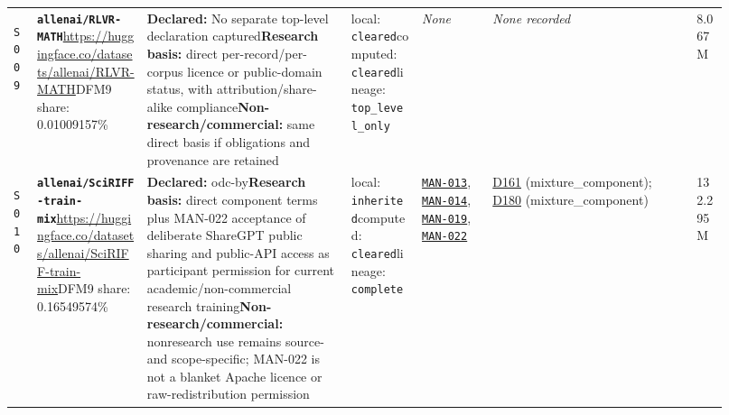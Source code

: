 \documentclass[9pt,a4paper]{article}
\newcommand{\srcid}[1]{\hypertarget{src:#1}{\texttt{#1}}}
\begin{document}
\begin{landscape}
\begin{longtable}{@{}L{0.03\linewidth}L{0.14\linewidth}L{0.26\linewidth}L{0.09\linewidth}L{0.09\linewidth}L{0.265\linewidth}L{0.045\linewidth}@{}}
\srcid{S009} & \textbf{\nolinkurl{allenai/RLVR-MATH}}\newline \url{https://huggingface.co/datasets/allenai/RLVR-MATH}\newline DFM9 share: 0.01009157\% & \textbf{Declared:} No separate top-level declaration captured\newline \textbf{Research basis:} direct per-record/per-corpus licence or public-domain status, with attribution/share-alike compliance\newline \textbf{Non-research/commercial:} same direct basis if obligations and provenance are retained & local: \texttt{cleared}\newline computed: \texttt{cleared}\newline lineage: \texttt{top\_level\_only} & \textit{None} & \textit{None recorded} & 8.067M \\
\srcid{S010} & \textbf{\nolinkurl{allenai/SciRIFF-train-mix}}\newline \url{https://huggingface.co/datasets/allenai/SciRIFF-train-mix}\newline DFM9 share: 0.16549574\% & \textbf{Declared:} odc-by\newline \textbf{Research basis:} direct component terms plus MAN-022 acceptance of deliberate ShareGPT public sharing and public-API access as participant permission for current academic/non-commercial research training\newline \textbf{Non-research/commercial:} nonresearch use remains source- and scope-specific; MAN-022 is not a blanket Apache licence or raw-redistribution permission & local: \texttt{inherited}\newline computed: \texttt{cleared}\newline lineage: \texttt{complete} & \hyperlink{manual:MAN-013}{\texttt{MAN-013}}, \hyperlink{manual:MAN-014}{\texttt{MAN-014}}, \hyperlink{manual:MAN-019}{\texttt{MAN-019}}, \hyperlink{manual:MAN-022}{\texttt{MAN-022}} & \hyperlink{dep:D161}{D161} (mixture\_component); \hyperlink{dep:D180}{D180} (mixture\_component) & 132.295M \\

\end{longtable}
\end{landscape}
\end{document}
